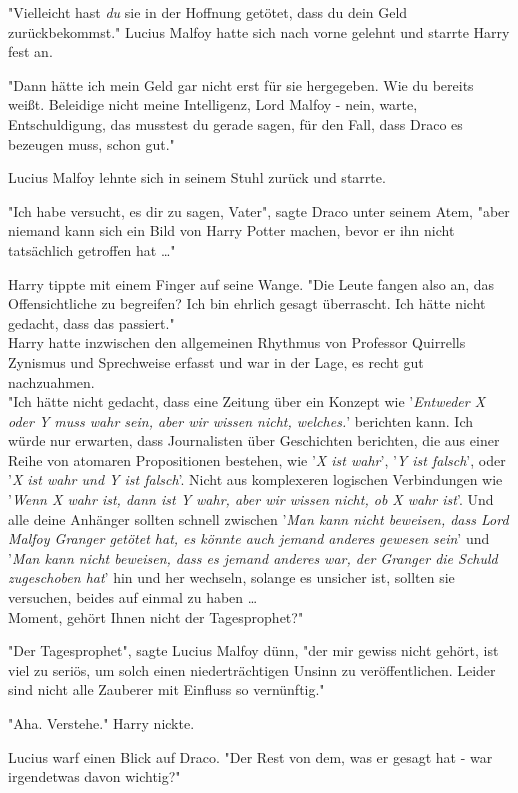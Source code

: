 {"Vielleicht hast \emph{du} sie in der Hoffnung getötet, dass du dein Geld zurückbekommst." Lucius Malfoy hatte sich nach vorne gelehnt und starrte Harry fest an.

"Dann hätte ich mein Geld gar nicht erst für sie hergegeben. Wie du bereits weißt. Beleidige nicht meine Intelligenz, Lord Malfoy - nein, warte, Entschuldigung, das musstest du gerade sagen, für den Fall, dass Draco es bezeugen muss, schon gut."

Lucius Malfoy lehnte sich in seinem Stuhl zurück und starrte.

"Ich habe versucht, es dir zu sagen, Vater", sagte Draco unter seinem Atem, "aber niemand kann sich ein Bild von Harry Potter machen, bevor er ihn nicht tatsächlich getroffen hat …"

Harry tippte mit einem Finger auf seine Wange. "Die Leute fangen also an, das Offensichtliche zu begreifen? Ich bin ehrlich gesagt überrascht. Ich hätte nicht gedacht, dass das passiert."\\ Harry hatte inzwischen den allgemeinen Rhythmus von Professor Quirrells Zynismus und Sprechweise erfasst und war in der Lage, es recht gut nachzuahmen.\\ "Ich hätte nicht gedacht, dass eine Zeitung über ein Konzept wie '\emph{Entweder X oder Y muss wahr sein, aber wir wissen nicht, welches.}' berichten kann. Ich würde nur erwarten, dass Journalisten über Geschichten berichten, die aus einer Reihe von atomaren Propositionen bestehen, wie '\emph{X ist wahr}', '\emph{Y ist falsch}', oder '\emph{X ist wahr und Y ist falsch}'. Nicht aus komplexeren logischen Verbindungen wie '\emph{Wenn X wahr ist, dann ist Y wahr, aber wir wissen nicht, ob X wahr ist}'. Und alle deine Anhänger sollten schnell zwischen '\emph{Man kann nicht beweisen, dass Lord Malfoy Granger getötet hat, es könnte auch jemand anderes gewesen sein}' und '\emph{Man kann nicht beweisen, dass es jemand anderes war, der Granger die Schuld zugeschoben hat}' hin und her wechseln, solange es unsicher ist, sollten sie versuchen, beides auf einmal zu haben …\\ Moment, gehört Ihnen nicht der Tagesprophet?"

"Der Tagesprophet", sagte Lucius Malfoy dünn, "der mir gewiss nicht gehört, ist viel zu seriös, um solch einen niederträchtigen Unsinn zu veröffentlichen. Leider sind nicht alle Zauberer mit Einfluss so vernünftig."

"Aha. Verstehe." Harry nickte.

Lucius warf einen Blick auf Draco. "Der Rest von dem, was er gesagt hat - war irgendetwas davon wichtig?"

}
